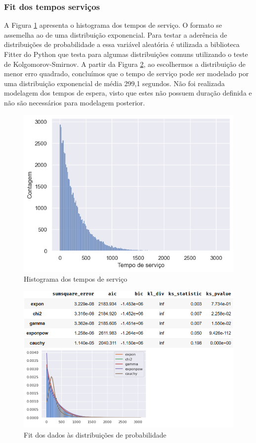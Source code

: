 \subsubsection{Fit dos tempos serviços}
A Figura \ref*{fig: hist-servicos} apresenta o histograma dos tempos de serviço. O formato se assemelha ao de uma distribuição exponencial. Para testar a aderência de distribuições de probabilidade a essa variável aleatória é utilizada a biblioteca Fitter do Python que testa para algumas distribuições comuns utilizando o teste de Kolgomorov-Smirnov. A partir da Figura \ref*{fig: fit-servicos}, ao escolhermos a distribuição de menor erro quadrado, concluímos que o tempo de serviço pode ser modelado por uma distribuição exponencial de média 299,1 segundos. Não foi realizada modelagem dos tempos de espera, visto que estes não possuem duração definida e não são necessários para modelagem posterior.

\begin{figure}[H]
    \includegraphics{analise-de-dados/anual/histograma-servicos.png}
    \caption{Histograma dos tempos de serviço}
    \label{fig: hist-servicos}
\end{figure}

\begin{figure}[H]
    \includegraphics[scale=.9]{analise-de-dados/anual/fit-servicos.png}
    \caption{Fit dos dados às distribuições de probabilidade}
    \label{fig: fit-servicos}
\end{figure}

